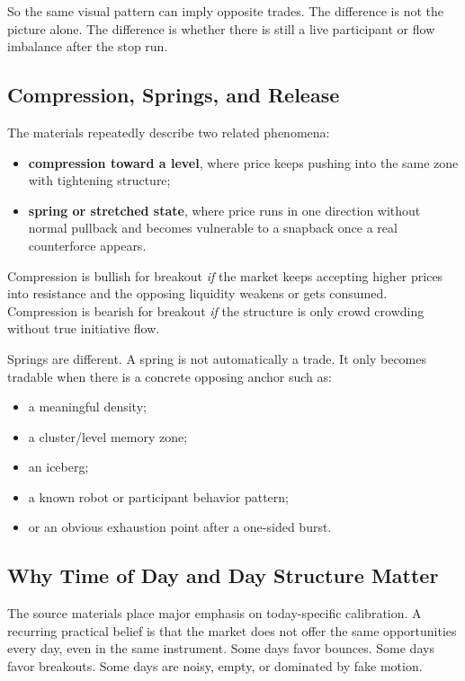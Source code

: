So the same visual pattern can imply opposite trades.
The difference is not the picture alone.
The difference is whether there is still a live participant or flow imbalance after the stop run.

\subsection{Compression, Springs, and Release}

The materials repeatedly describe two related phenomena:
\begin{itemize}
  \item \textbf{compression toward a level}, where price keeps pushing into the same zone with tightening structure;
  \item \textbf{spring or stretched state}, where price runs in one direction without normal pullback and becomes vulnerable to a snapback once a real counterforce appears.
\end{itemize}

Compression is bullish for breakout \emph{if} the market keeps accepting higher prices into resistance and the opposing liquidity weakens or gets consumed.
Compression is bearish for breakout \emph{if} the structure is only crowd crowding without true initiative flow.

Springs are different.
A spring is not automatically a trade.
It only becomes tradable when there is a concrete opposing anchor such as:
\begin{itemize}
  \item a meaningful density;
  \item a cluster/level memory zone;
  \item an iceberg;
  \item a known robot or participant behavior pattern;
  \item or an obvious exhaustion point after a one-sided burst.
\end{itemize}

\subsection{Why Time of Day and Day Structure Matter}

The source materials place major emphasis on today-specific calibration.
A recurring practical belief is that the market does not offer the same opportunities every day, even in the same instrument.
Some days favor bounces.
Some days favor breakouts.
Some days are noisy, empty, or dominated by fake motion.

